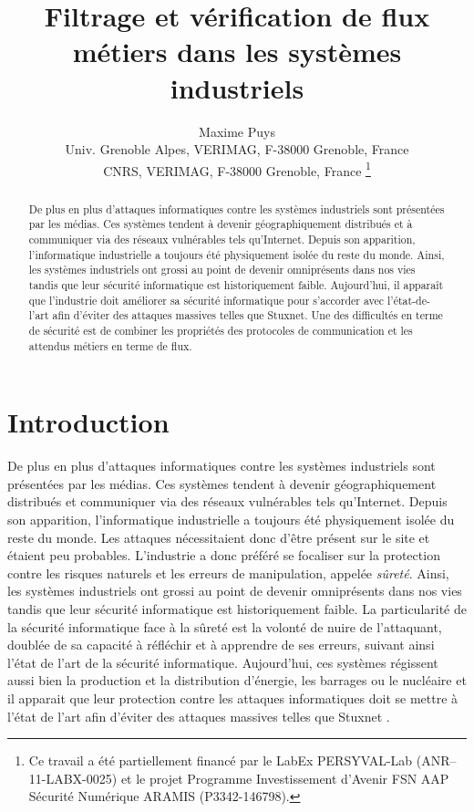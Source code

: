 \documentclass{article}
\title{Filtrage et vérification de flux métiers dans les systèmes industriels}
\author{
    Maxime Puys\\
    Univ. Grenoble Alpes, VERIMAG, F-38000 Grenoble, France\\
    CNRS, VERIMAG, F-38000 Grenoble, France
    \thanks{Ce travail a été partiellement financé par le LabEx PERSYVAL-Lab (ANR–11-LABX-0025) et le projet Programme Investissement d’Avenir FSN AAP Sécurité Numérique \no 3 ARAMIS (P3342-146798).}
}
\date{}
\begin{document}
\maketitle

\begin{abstract}
    De plus en plus d’attaques informatiques contre les systèmes industriels
    sont présentées par les médias.
    Ces systèmes tendent à devenir géographiquement distribués et à communiquer
    via des réseaux vulnérables tels qu’Internet.
    Depuis son apparition, l’informatique industrielle a toujours été
    physiquement isolée du reste du monde.
    Ainsi, les systèmes industriels ont grossi au point de devenir omniprésents
    dans nos vies tandis que leur sécurité informatique est historiquement
    faible.
    Aujourd'hui, il apparaît que l'industrie doit améliorer sa sécurité
    informatique pour s'accorder avec l'état-de-l'art afin d'éviter des
    attaques massives telles que Stuxnet.
    Une des difficultés en terme de sécurité est de combiner les propriétés des
    protocoles de communication et les attendus métiers en terme de flux.
\end{abstract}

\section{Introduction}

De plus en plus d'attaques informatiques contre les systèmes industriels sont
présentées par les médias.
Ces systèmes tendent à devenir géographiquement distribués et communiquer via
des réseaux vulnérables tels qu'Internet.
Depuis son apparition, l'informatique industrielle a toujours été physiquement
isolée du reste du monde.
Les attaques nécessitaient donc d'être présent sur le site et étaient peu
probables.
L'industrie a donc préféré se focaliser sur la protection contre les risques
naturels et les erreurs de manipulation, appelée {\em sûreté}.
Ainsi, les systèmes industriels ont grossi au point de devenir omniprésents
dans nos vies tandis que leur sécurité informatique est historiquement faible.
La particularité de la sécurité informatique face à la sûreté est la volonté
de nuire de l'attaquant, doublée de sa capacité à réfléchir et à apprendre de
ses erreurs, suivant ainsi l'état de l'art de la sécurité informatique.
Aujourd'hui, ces systèmes régissent aussi bien la production et la distribution
d'énergie, les barrages ou le nucléaire et il apparait que leur protection
contre les attaques informatiques doit se mettre à l'état de l'art afin d'éviter
des attaques massives telles que Stuxnet \cite{Lan11}.
\end{document}
